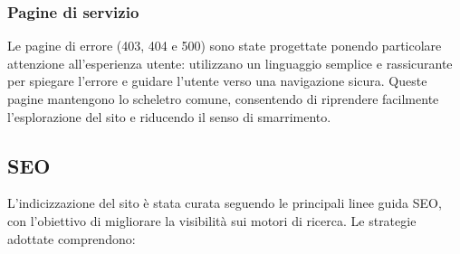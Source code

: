 \documentclass[10pt, letterpaper]{article}
\begin{document}
\subsubsection{Pagine di servizio}
Le pagine di errore (403, 404 e 500) sono state progettate ponendo particolare attenzione all’esperienza utente: utilizzano un linguaggio semplice e rassicurante per spiegare l’errore e guidare l’utente verso una navigazione sicura. 
Queste pagine mantengono lo scheletro comune, consentendo di riprendere facilmente l’esplorazione del sito e riducendo il senso di smarrimento.

\subsection{SEO}
L’indicizzazione del sito è stata curata seguendo le principali linee guida SEO, con l’obiettivo di migliorare la visibilità sui motori di ricerca. Le strategie adottate comprendono:
\end{document}
